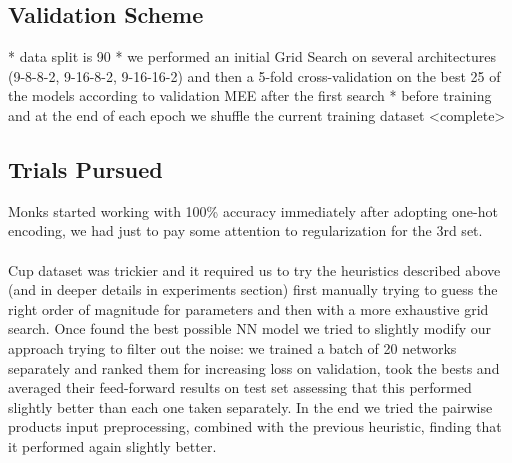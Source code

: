 \subsection{Validation Scheme}

 * data split is 90%
 * we performed an initial Grid Search on several architectures (9-8-8-2, 9-16-8-2, 9-16-16-2) and then a 5-fold cross-validation on the best 25%
 of the models according to validation MEE after the first search
 * before training and at the end of each epoch we shuffle the current training dataset
 <complete>

\subsection{Trials Pursued}

Monks started working with 100\% accuracy immediately after adopting one-hot encoding, we had just to pay some attention to regularization for the 3rd set.

\paragraph{}
Cup dataset was trickier and it required us to try the heuristics described above (and in deeper details in experiments section) first manually trying to guess the right order of magnitude for parameters and then with a more exhaustive grid search. Once found the best possible NN model we tried to slightly modify our approach trying to filter out the noise: we trained a batch of 20 networks separately and ranked them for increasing loss on validation, took the bests and averaged their feed-forward results on test set assessing that this performed slightly better than each one taken separately. In the end we tried the pairwise products input preprocessing, combined with the previous heuristic, finding that it performed again slightly better. 



